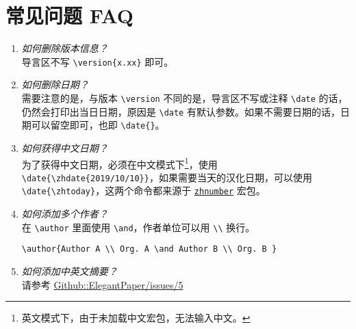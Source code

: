 \documentclass[lang=cn,11pt,numbers, a4paper]{elegantpaper}
\begin{document}
\section{常见问题 FAQ}

\begin{enumerate}[label=\arabic*).]
\item \textit{如何删除版本信息？}\\
导言区不写 \lstinline|\version{x.xx}| 即可。
\item \textit{如何删除日期？}\\
需要注意的是，与版本 \lstinline{\version} 不同的是，导言区不写或注释 \lstinline{\date} 的话，仍然会打印出当日日期，原因是 \lstinline{\date} 有默认参数。如果不需要日期的话，日期可以留空即可，也即 \lstinline|\date{}|。
\item \textit{如何获得中文日期？}\\
为了获得中文日期，必须在中文模式下\footnote{英文模式下，由于未加载中文宏包，无法输入中文。}，使用 \lstinline|\date{\zhdate{2019/10/10}}|，如果需要当天的汉化日期，可以使用 \lstinline|\date{\zhtoday}|，这两个命令都来源于 \href{https://ctan.org/pkg/zhnumber}{\lstinline{zhnumber}} 宏包。
\item \textit{如何添加多个作者？}\\
在 \lstinline{\author} 里面使用 \lstinline{\and}，作者单位可以用 \lstinline{\\} 换行。
\begin{lstlisting}
\author{Author A \\ Org. A \and Author B \\ Org. B }
\end{lstlisting}
\item \textit{如何添加中英文摘要？}\\
请参考 \href{https://github.com/ElegantLaTeX/ElegantPaper/issues/5}{Github::ElegantPaper/issues/5}
\end{enumerate}
\end{document}
